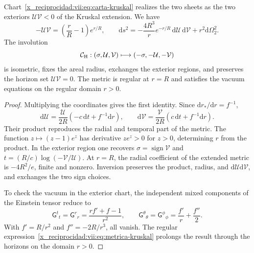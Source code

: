 \begin{theorem}
\label{x_reciprocidad:vii:thm:kruskal-hojas}
Chart~\eqref{x_reciprocidad:vii:eq:carta-kruskal} realizes the two sheets as the
two exteriors \(\mathcal U\mathcal V<0\) of the Kruskal
extension. We have
\begin{equation}
 -\mathcal U\mathcal V=\left(\frac rR-1\right)e^{r/R},\qquad
 \mathrm ds^2=-\frac{4R^3}{r}e^{-r/R}\,
                    \mathrm d\mathcal U\,\mathrm d\mathcal V
                    +r^2\mathrm d\Omega_2^2.
 \label{x_reciprocidad:vii:eq:metrica-kruskal}
\end{equation}
The involution
\begin{equation}
 \mathcal C_{\rm H}:(\sigma,\mathcal U,\mathcal V)
 \longmapsto(-\sigma,-\mathcal U,-\mathcal V)
 \label{x_reciprocidad:vii:eq:involucion-horizonte}
\end{equation}
is isometric, fixes the areal radius, exchanges the exterior regions, and preserves
the horizon set \(\mathcal U\mathcal V=0\).
The metric is regular at \(r=R\) and satisfies the vacuum equations
on the regular domain \(r>0\).
\end{theorem}
\begin{proof}
Multiplying the coordinates gives the first identity. Since
\(\mathrm dr_*/\mathrm dr=f^{-1}\),
\[
 \mathrm d\mathcal U=\frac{\mathcal U}{2R}
            (-c\,\mathrm dt+f^{-1}\mathrm dr),\qquad
 \mathrm d\mathcal V=\frac{\mathcal V}{2R}
            ( c\,\mathrm dt+f^{-1}\mathrm dr).
\]
Their product reproduces the radial and temporal part of the metric.
The function \(z\mapsto(z-1)e^z\) has derivative \(ze^z>0\)
for \(z>0\), determining \(r\) from the product.
In the exterior region one recovers
\(\sigma=\operatorname{sign}\mathcal V\) and
\(t=(R/c)\log(-\mathcal V/\mathcal U)\).
At \(r=R\), the radial coefficient of the extended metric is
\(-4R^2/e\), finite and nonzero. Inversion preserves the
product, radius, and \(\mathrm d\mathcal U\mathrm d\mathcal V\),
and exchanges the two sign choices.

To check the vacuum in the exterior chart, the independent mixed
components of the Einstein tensor reduce to
\[
 \mathsf G^t{}_t=\mathsf G^r{}_r
 =\frac{rf'+f-1}{r^2},\qquad
 \mathsf G^\theta{}_\theta=\mathsf G^\phi{}_\phi
 =\frac{f'}r+\frac{f''}2.
\]
With \(f'=R/r^2\) and \(f''=-2R/r^3\), all vanish.
The regular expression~\eqref{x_reciprocidad:vii:eq:metrica-kruskal} prolongs the
result through the horizons on the domain \(r>0\).
\end{proof}


